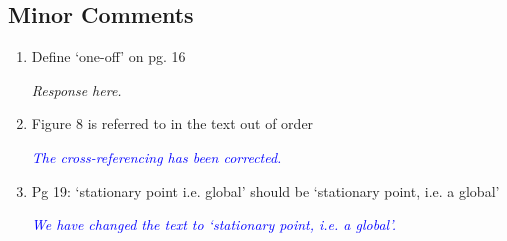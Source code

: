 \documentclass{article}
\newcommand{\parham}[1]{\textcolor{blue}{#1}}
\begin{document}
			\subsection{Minor Comments}
			\begin{enumerate}
			 \item 	Define `one-off' on pg. 16 

 			\emph{Response here.}

  		\item Figure 8 is referred to in the text out of order

  			\emph{\parham{The cross-referencing has been corrected.}}
			 
			\item Pg 19: `stationary point i.e. global' should be `stationary point, i.e. a global'

			\emph{\parham{We have changed the text to `stationary point, i.e. a global'.}}			
			                   
			
			 
				\end{enumerate} 
				
			
\end{document}
